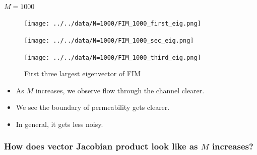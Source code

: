 \documentclass[
]{article}
\makeatletter
\let\oldparagraph\paragraph
\renewcommand{\paragraph}{
    \@ifstar
      \xxxParagraphStar
      \xxxParagraphNoStar
  }
\newcommand{\xxxParagraphStar}[1]{\oldparagraph*{#1}\mbox{}}
\newcommand{\xxxParagraphNoStar}[1]{\oldparagraph{#1}\mbox{}}
\providecommand{\tightlist}{%
  \setlength{\itemsep}{0pt}\setlength{\parskip}{0pt}}\usepackage{longtable,booktabs,array}
\makeatother
\begin{document}
\paragraph{\texorpdfstring{\(M = 1000\)}{M = 1000}}\label{m-1000}

\begin{figure}

\begin{minipage}{0.33\linewidth}

\texttt{[image: ../../data/N=1000/FIM\_1000\_first\_eig.png]}

\end{minipage}%
%
\begin{minipage}{0.33\linewidth}

\texttt{[image: ../../data/N=1000/FIM\_1000\_sec\_eig.png]}

\end{minipage}%
%
\begin{minipage}{0.33\linewidth}

\texttt{[image: ../../data/N=1000/FIM\_1000\_third\_eig.png]}

\end{minipage}%

\caption{\label{fig-eig1000}First three largest eigenvector of FIM}

\end{figure}%

\begin{itemize}
\tightlist
\item
  As \(M\) increases, we observe flow through the channel clearer.
\item
  We see the boundary of permeability gets clearer.
\item
  In general, it gets less noisy.
\end{itemize}

\subsubsection{\texorpdfstring{How does vector Jacobian product look
like as \(M\)
increases?}{How does vector Jacobian product look like as M increases?}}\label{how-does-vector-jacobian-product-look-like-as-m-increases}
\end{document}
